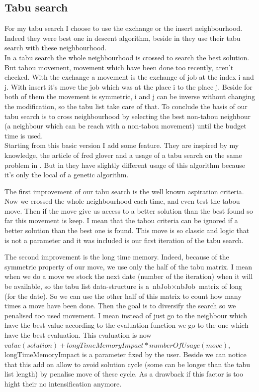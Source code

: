 \documentclass[12pt,a4paper]{article}
\begin{document}
\subsection{Tabu search}

For my tabu search I choose to use the exchange or the insert neighbourhood. Indeed they were best one in descent algorithm, beside in \cite{Tseng2010121} they use their tabu search with these neighbourhood.\\

In a tabu search the whole neighbourhood is crossed to search the best solution. But tabou movement, movement which have been done too recently, aren't checked. With the exchange a movement is the exchange of job at the index i and j. With insert it's move the job which was at the place i to the place j. Beside for both of them the movement is symmetric, i and j can be inverse without changing the modification, so the tabu list take care of that. To conclude the basis of our tabu search is to cross neighbourhood by selecting the best non-tabou neighbour (a neighbour which can be reach with a non-tabou movement) until the budget time is used.\\

Starting from this basic version I add some feature. They are inspired by my knowledge, the article of fred glover \cite{tabuprinciple} and a usage of a tabu search on the same problem in \cite{Tseng2010121}. But in \cite{Tseng2010121} they have slightly different usage of this algorithm because it's only the local of a genetic algorithm.

The first improvement of our tabu search is the well known aspiration criteria. Now we crossed the whole neighbourhood each time, and even test the tabou move. Then if the move give us access to a better solution than the best found so far this movement is keep. I mean that the tabou criteria can be ignored if a better solution than the best one is found. This move is so classic and logic that is not a parameter and it was included is our first iteration of the tabu search.

The second improvement is the long time memory. Indeed, because of the symmetric property of our move, we use only the half of the tabu matrix. I mean when we do a move we stock the next date (number of the iteration) when it will be available, so the tabu list data-structure is a $\text{nbJob} \times \text{nbJob}$ matrix of long (for the date). So we can use the other half of this matrix to count how many times a move have been done. Then the goal is to diversify the search so we penalised too used movement. I mean instead of just go to the neighbour which have the best value according to the evaluation function we go to the one which have the best evaluation. This evaluation is now $value(solution) + longTimeMemoryImpact*numberOfUsage(move)$, longTimeMemoryImpact is a parameter fixed by the user. Beside we can notice that this add on allow to avoid solution cycle (some can be longer than the tabu list length) by penalise move of these cycle. As a drawback if this factor is too hight their no intensification anymore.
\end{document}
